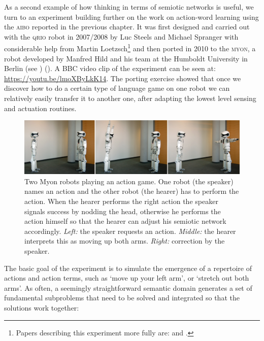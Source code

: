 As a second example of how thinking in terms of semiotic networks is useful,
we turn to an experiment building further on the work on action-word learning 
using the \textsc{aibo} reported in the previous chapter.
It was first designed and carried out with the \textsc{qrio} robot in 2007/2008 by Luc Steels and
Michael Spranger with considerable help from Martin Loetzsch\footnote{Papers describing this experiment more fully are: 
\cite{Steels:2008spatial} and \cite{Steels:2008b}.} and 
then ported in 2010 to the \textsc{myon}, a robot developed by Manfred Hild and his team at the Humboldt 
University in Berlin (see ) (\cite{Steels:2012b}). 
A BBC video clip of the experiment can be seen at: \url{https://youtu.be/lmoXByLkK14}.
The porting exercise showed that once we discover how to do a certain type of language game on one robot 
we can relatively easily transfer it to another one, after adapting the lowest level sensing and actuation routines. 

\begin{figure}[htbp]
  \centerline{\includegraphics[width=1.0\textwidth]{chap11/figs/myon-action-game.pdf}}
\caption{
Two Myon robots playing an action game. One robot (the speaker) names an action and the other robot (the hearer) 
has to perform the action. When the hearer performs the right action the speaker signals success by nodding the head, 
otherwise he performs the action himself so that the hearer can adjust his semiotic network accordingly. {\itshape Left:} the speaker
requests an action. {\itshape Middle:} the hearer interprets this as moving up both arms. {\itshape Right:} correction by the speaker. 
}\label{fig:myon-action} 
\end{figure}

The basic goal of the experiment is to simulate the emergence of a repertoire of actions and action terms, such as 
`move up your left arm', or `stretch out both arms'. As often, a seemingly straightforward semantic domain generates 
a set of fundamental subproblems that need to be solved and integrated so that the solutions work together: 

